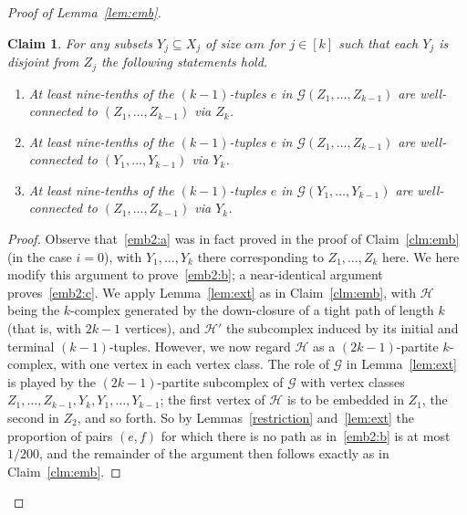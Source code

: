 \documentclass[12pt,a4paper]{amsart}
\def\itm#1{\rm ({#1})}
\def\itmit#1{\itm{\it #1\,}}
\def\abc{\itmit{\alph{*}}}
\newtheorem{claim}[theorem] {Claim}
\newcommand{\oldqed}{}
\def\endofClaim{\hfill\scalebox{.6}{$\Box$}}
\newenvironment{claimproof}[1][Proof]{
  \renewcommand{\oldqed}{\qedsymbol}
  \renewcommand{\qedsymbol}{\endofClaim}
  \begin{proof}[#1]
}{
  \end{proof}
  \renewcommand{\qedsymbol}{\oldqed}
}
\newcommand{\cG}{\mathcal{G}}
\begin{document}
\begin{proof}[Proof of Lemma~\ref{lem:emb}]
\begin{claim} \label{clm:emb2}
For any subsets $Y_j \subseteq X_j$ of size $\alpha m$ for $j \in [k]$ such that each $Y_j$ is disjoint from $Z_j$ the following statements hold. \begin{enumerate}[label=\abc]
\item\label{emb2:a} At least nine-tenths of the $(k-1)$-tuples $e$ in $\cG(Z_1,\ldots,Z_{k-1})$ are well-connected to $(Z_1, \dots, Z_{k-1})$ via $Z_k$.
\item\label{emb2:b} At least nine-tenths of the $(k-1)$-tuples $e$ in $\cG(Z_1,\ldots,Z_{k-1})$ are well-connected to $(Y_1, \dots, Y_{k-1})$ via $Y_k$.
\item\label{emb2:c} At least nine-tenths of the $(k-1)$-tuples $e$ in $\cG(Y_1,\ldots,Y_{k-1})$ are well-connected to $(Z_1, \dots, Z_{k-1})$ via $Y_k$. 
\end{enumerate}
\end{claim}
  
\begin{claimproof}
Observe that~\ref{emb2:a} was in fact proved in the proof of Claim~\ref{clm:emb} (in the case $i=0$), with $Y_1, \dots, Y_{k}$ there corresponding to $Z_1, \dots, Z_{k}$ here. We here modify this argument to prove~\ref{emb2:b}; a near-identical argument proves~\ref{emb2:c}.
 We apply Lemma~\ref{lem:ext} as in Claim~\ref{clm:emb}, with 
$\mathcal{H}$ being the $k$-complex generated by the down-closure of a tight path of length $k$ (that is, with $2k-1$ vertices), and $\mathcal{H}'$ the subcomplex
 induced by its initial and terminal $(k-1)$-tuples. However, we now regard $\mathcal{H}$ as a $(2k-1)$-partite $k$-complex, with one vertex in each vertex class. The role of $\cG$ in Lemma~\ref{lem:ext} is played by the $(2k-1)$-partite subcomplex of $\cG$ with vertex classes $Z_1, \dots, Z_{k-1}, Y_k, Y_1, \dots, Y_{k-1}$; the first vertex of $\mathcal{H}$ is to be embedded in $Z_1$, the second in $Z_2$, and so forth. So by Lemmas~\ref{restriction} and~\ref{lem:ext} the proportion of pairs $(e, f)$ for which there is no path as in~\ref{emb2:b} is at most $1/200$, and the remainder of the argument then follows exactly as in Claim~\ref{clm:emb}.
 \end{claimproof}
  

\end{proof}
\end{document}

